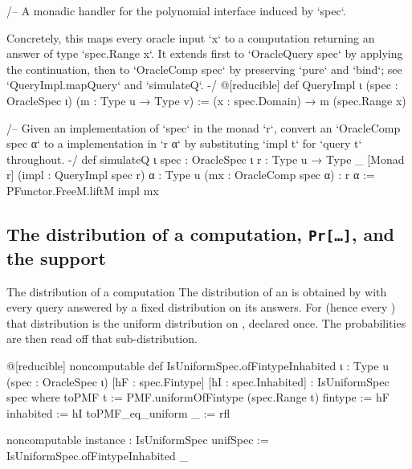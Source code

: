 \begin{leancode}
/-- A monadic handler for the polynomial interface induced by `spec`.

Concretely, this maps every oracle input `x` to a computation returning an
answer of type `spec.Range x`. It extends first to `OracleQuery spec` by
applying the continuation, then to `OracleComp spec` by preserving `pure` and
`bind`; see `QueryImpl.mapQuery` and `simulateQ`. -/
@[reducible] def QueryImpl {ι} (spec : OracleSpec ι) (m : Type u → Type v) :=
  (x : spec.Domain) → m (spec.Range x)
\end{leancode}



\begin{leancode}
/-- Given an implementation of `spec` in the monad `r`, convert an `OracleComp spec α` to a
implementation in `r α` by substituting `impl t` for `query t` throughout. -/
def simulateQ {ι} {spec : OracleSpec ι} {r : Type u → Type _} [Monad r]
    (impl : QueryImpl spec r) {α : Type u} (mx : OracleComp spec α) : r α :=
  PFunctor.FreeM.liftM impl mx
\end{leancode}


\subsection{The distribution of a computation, \texorpdfstring{\texttt{Pr[…]}}{Pr[...]}, and the support}\label{sec:gen-lib-vcvio-dist}

\begin{define}{The distribution of a computation}
The distribution of an  is obtained by  with every query
answered by a fixed distribution on its answers. For  (hence every
) that distribution is the uniform distribution on , declared
once. The probabilities are then read off that sub-distribution.
\end{define}

\begin{leancode}
@[reducible] noncomputable def IsUniformSpec.ofFintypeInhabited
    {ι : Type u} (spec : OracleSpec ι)
    [hF : spec.Fintype] [hI : spec.Inhabited] : IsUniformSpec spec where
  toPMF t := PMF.uniformOfFintype (spec.Range t)
  fintype := hF
  inhabited := hI
  toPMF_eq_uniform _ := rfl

noncomputable instance : IsUniformSpec unifSpec := IsUniformSpec.ofFintypeInhabited _
\end{leancode}

